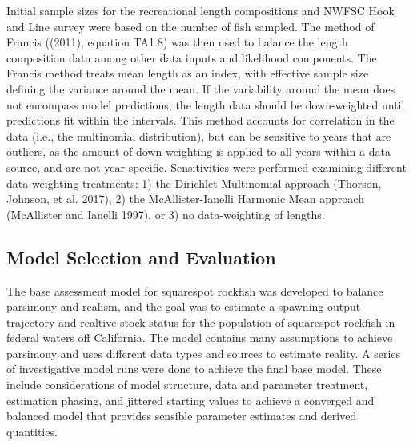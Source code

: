 \documentclass[11pt,
  english,
  a4paper,
]{article}
\begin{document}

Initial sample sizes for the recreational length compositions and NWFSC Hook and Line survey were based on the number of fish sampled. The method of Francis ({(2011)\leavevmode\tagmcend\tagstructend}, equation TA1.8) was then used to balance the length composition data among other data inputs and likelihood components. The Francis method treats mean length as an index, with effective sample size defining the variance around the mean. If the variability around the mean does not encompass model predictions, the length data should be down-weighted until predictions fit within the intervals. This method accounts for correlation in the data (i.e., the multinomial distribution), but can be sensitive to years that are outliers, as the amount of down-weighting is applied to all years within a data source, and are not year-specific. Sensitivities were performed examining different data-weighting treatments: 1) the Dirichlet-Multinomial approach {(Thorson, Johnson, et al. 2017)\leavevmode\tagmcend\tagstructend}, 2) the McAllister-Ianelli Harmonic Mean approach {(McAllister and Ianelli 1997)\leavevmode\tagmcend\tagstructend}, or 3) no data-weighting of lengths.

\leavevmode\tagmcend\tagstructend\par


\hypertarget{model-selection-and-evaluation}{%
\subsection{Model Selection and Evaluation}\label{model-selection-and-evaluation}}

\leavevmode\tagmcend\tagstructend


The base assessment model for squarespot rockfish was developed to balance parsimony and realism, and the goal was to estimate a spawning output trajectory and realtive stock status for the population of squarespot rockfish in federal waters off California. The model contains many assumptions to achieve parsimony and uses different data types and sources to estimate reality. A series of investigative model runs were done to achieve the final base model. These include considerations of model structure, data and parameter treatment, estimation phasing, and jittered starting values to achieve a converged and balanced model that provides sensible parameter estimates and derived quantities.
\end{document}
